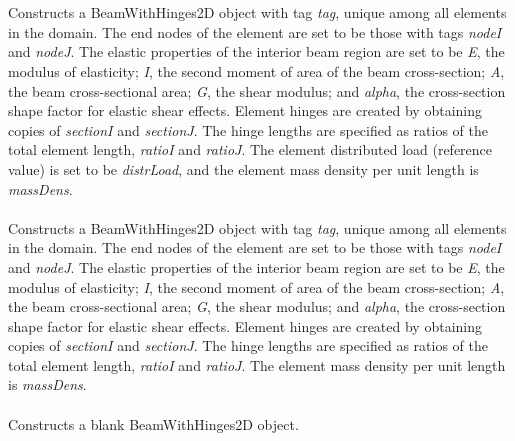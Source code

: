   \\
  \\
Constructs a BeamWithHinges2D object with tag {\em tag}, unique among all elements
in the domain.  The end nodes of the element are set to be those with tags 
{\em nodeI} and {\em nodeJ}.  The elastic properties of the interior beam region
are set to be {\em E}, the modulus of elasticity; {\em I}, the second moment of
area of the beam cross-section; {\em A}, the beam cross-sectional area; {\em G},
the shear modulus; and {\em alpha}, the cross-section shape factor for elastic shear 
effects.  Element hinges are created by obtaining copies of {\em sectionI} and {\em sectionJ}.
The hinge lengths are specified as ratios of the total element length, {\em ratioI}
and {\em ratioJ}.  The element distributed load (reference value) is set to be {\em distrLoad},
and the element mass density per unit length is {\em massDens}. \\

  \\
Constructs a BeamWithHinges2D object with tag {\em tag}, unique among all elements
in the domain.  The end nodes of the element are set to be those with tags 
{\em nodeI} and {\em nodeJ}.  The elastic properties of the interior beam region
are set to be {\em E}, the modulus of elasticity; {\em I}, the second moment of
area of the beam cross-section; {\em A}, the beam cross-sectional area; {\em G},
the shear modulus; and {\em alpha}, the cross-section shape factor for elastic shear 
effects.  Element hinges are created by obtaining copies of {\em sectionI} and {\em sectionJ}.
The hinge lengths are specified as ratios of the total element length, {\em ratioI}
and {\em ratioJ}.  The element mass density per unit length is {\em massDens}. \\

 \\
Constructs a blank BeamWithHinges2D object. \\

